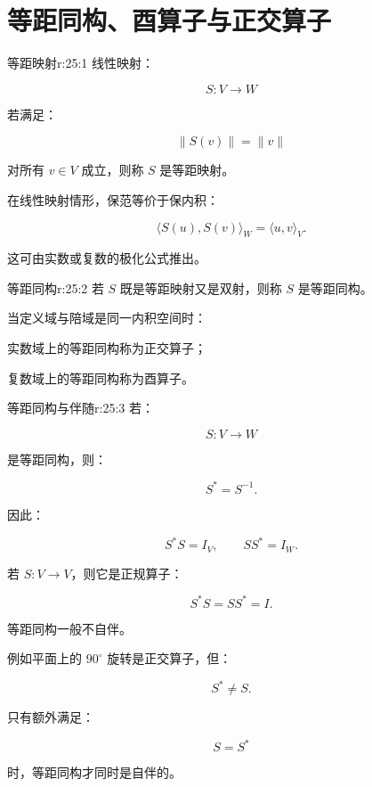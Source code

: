 
\chapter{等距同构、酉算子与正交算子}


\begin{jdefn}{等距映射}{r:25:1}
线性映射：

\[
S:V\to W
\]

若满足：

\[
\|S(v)\|=\|v\|
\]

对所有 $v\in V$ 成立，则称 $S$ 是等距映射。

在线性映射情形，保范等价于保内积：

\[
\langle S(u),S(v)\rangle_W
=
\langle u,v\rangle_V.
\]

这可由实数或复数的极化公式推出。
\end{jdefn}

\begin{jdefn}{等距同构}{r:25:2}
若 $S$ 既是等距映射又是双射，则称 $S$ 是等距同构。

当定义域与陪域是同一内积空间时：

\begin{jitem}
\item %
实数域上的等距同构称为正交算子；
\item %
复数域上的等距同构称为酉算子。
\end{jitem}
\end{jdefn}

\begin{jprop}{等距同构与伴随}{r:25:3}
若：

\[
S:V\to W
\]

是等距同构，则：

\[
S^*=S^{-1}.
\]

因此：

\[
S^*S=I_V,
\qquad
SS^*=I_W.
\]

若 $S:V\to V$，则它是正规算子：

\[
S^*S=SS^*=I.
\]

等距同构一般不自伴。

例如平面上的 $90^\circ$ 旋转是正交算子，但：

\[
S^*\ne S.
\]

只有额外满足：

\[
S=S^*
\]

时，等距同构才同时是自伴的。
\end{jprop}
